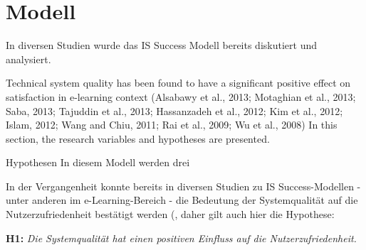 \section{Modell}
\label{sec:modell}
In diversen Studien wurde das IS Success Modell bereits diskutiert und analysiert. 

Technical system quality has been found to have a significant positive effect on satisfaction in e-learning context (Alsabawy et al., 2013; Motaghian et al., 2013; Saba, 2013; Tajuddin et al., 2013; Hassanzadeh et al., 2012; Kim et al., 2012; Islam, 2012; Wang and Chiu, 2011; Rai et al., 2009; Wu et al., 2008)
In this section, the research variables and hypotheses are presented.

Hypothesen 
In diesem Modell werden drei 

In der Vergangenheit konnte bereits in diversen Studien zu IS Success-Modellen - unter anderen im e-Learning-Bereich - die Bedeutung der Systemqualität auf die Nutzerzufriedenheit bestätigt werden (, daher gilt auch hier die Hypothese: 
  
\textbf{H1:} \textit{Die Systemqualität hat einen positiven Einfluss auf die Nutzerzufriedenheit.}

